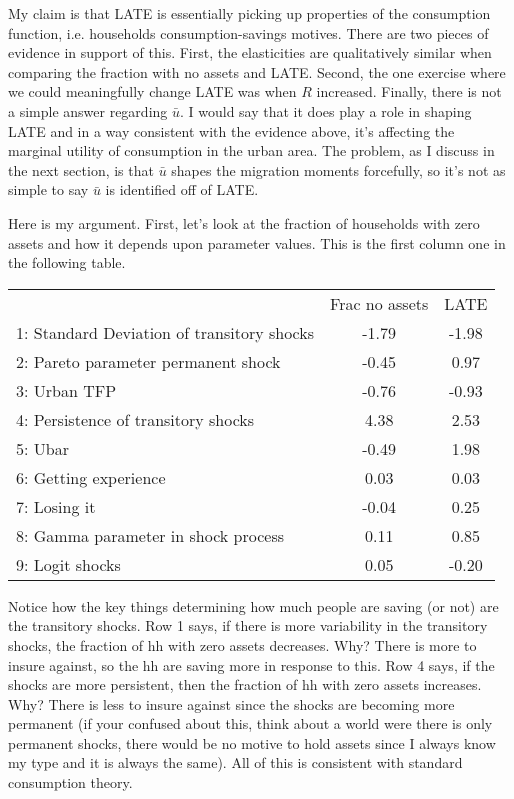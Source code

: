 \documentclass[pdftex,11pt]{article}
\renewcommand{\arraystretch}{.7}
\begin{document}
My claim is that LATE is essentially picking up properties of the consumption function, i.e. households consumption-savings motives. There are two pieces of evidence in support of this. First, the elasticities are qualitatively similar when comparing the fraction with no assets and LATE. Second, the one exercise where we could meaningfully change LATE was when $R$ increased. Finally, there is not a simple answer regarding $\bar u$. I would say that it does play a role in shaping LATE and in a way consistent with the evidence above, it's affecting the marginal utility of consumption in the urban area. The problem, as I discuss in the next section, is that $\bar u$ shapes the migration moments forcefully, so it's not as simple to say $\bar u$ is identified off of LATE.

Here is my argument. First, let's look at the fraction of households with zero assets and how it depends upon parameter values. This is the first column one in the following table.

\begin{table}[!h]
\footnotesize
\setlength {\tabcolsep}{1.5mm}
\renewcommand{\arraystretch}{2.25}
\begin{center}\label{tb:employment}
\begin{tabular}{l c c}
\hline
\hline
& Frac no assets & LATE \\
1: Standard Deviation of transitory shocks & -1.79   & -1.98  \\
2: Pareto parameter permanent shock &  -0.45         &  0.97  \\
3: Urban TFP &                           -0.76       & -0.93  \\
4: Persistence of transitory shocks &         4.38   &  2.53  \\
5: Ubar &                                    -0.49   &  1.98  \\
6: Getting experience &                       0.03   &  0.03  \\
7: Losing it &                               -0.04   &  0.25  \\
8: Gamma parameter in shock process &         0.11   &  0.85  \\
9: Logit shocks &                             0.05   & -0.20  \\
\hline
\hline
\end{tabular}
\end{center}
\end{table}

Notice how the key things determining how much people are saving (or not) are the transitory shocks. Row 1 says, if there is more variability in the transitory shocks, the fraction of hh with zero assets decreases. Why? There is more to insure against, so the hh are saving more in response to this.  Row 4 says, if the shocks are more persistent, then the fraction of hh with zero assets increases. Why? There is less to insure against since the shocks are becoming more permanent (if your confused about this, think about a world were there is only permanent shocks, there would be no motive to hold assets since I always know my type and it is always the same). All of this is consistent with standard consumption theory.
\end{document}
